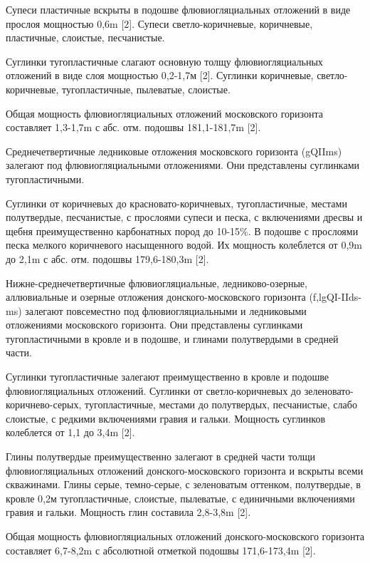 Супеси пластичные вскрыты в подошве флювиогляциальных отложений в виде прослоя мощностью 0,6\si{\meter} [2]. Супеси светло-коричневые, коричневые, пластичные, слоистые, песчанистые.

Суглинки тугопластичные слагают основную толщу флювиогляциальных отложений в виде слоя мощностью 0,2-1,7м [2]. Суглинки коричневые, светло-коричневые, тугопластичные, пылеватые, слоистые.

Общая мощность флювиогляциальных отложений московского горизонта составляет 1,3-1,7\si{\meter} с абс. отм. подошвы 181,1-181,7\si{\meter} [2].

Среднечетвертичные ледниковые отложения московского горизонта (gQIIms) залегают под флювиогляциальными отложениями. Они представлены суглинками тугопластичными.

Суглинки от коричневых до красновато-коричневых, тугопластичные, местами полутвердые, песчанистые, с прослоями супеси и песка, с включениями дресвы и щебня преимущественно карбонатных пород до 10-15\%. В подошве с прослоями песка мелкого коричневого насыщенного водой. Их мощность колеблется от 0,9\si{\meter} до 2,1\si{\meter} с абс. отм. подошвы 179,6-180,3\si{\meter} [2].

Нижне-среднечетвертичные флювиогляциальные, ледниково-озерные, аллювиальные и озерные отложения донского-московского горизонта (f,lgQI-IIds-ms) залегают повсеместно под флювиогляциальными и ледниковыми отложениями московского горизонта. Они представлены суглинками тугопластичными в кровле и в подошве, и глинами полутвердыми в средней части.

Суглинки тугопластичные залегают преимущественно в кровле и подошве флювиогляциальных отложений. Суглинки от светло-коричневых до зеленовато-коричнево-серых, тугопластичные, местами до полутвердых, песчанистые, слабо слоистые, с редкими включениями гравия и гальки. Мощность суглинков колеблется от 1,1 до 3,4\si{\meter} [2].

Глины полутвердые преимущественно залегают в средней части толщи флювиогляциальных отложений донского-московского горизонта и вскрыты всеми скважинами. Глины серые, темно-серые, с зеленоватым оттенком, полутвердые, в кровле 0,2м тугопластичные, слоистые, пылеватые, с единичными включениями гравия и гальки. Мощность глин составила 2,8-3,8\si{\meter} [2].

Общая мощность флювиогляциальных отложений донского-московского горизонта составляет 6,7-8,2\si{\meter} с абсолютной отметкой подошвы 171,6-173,4\si{\meter} [2].

